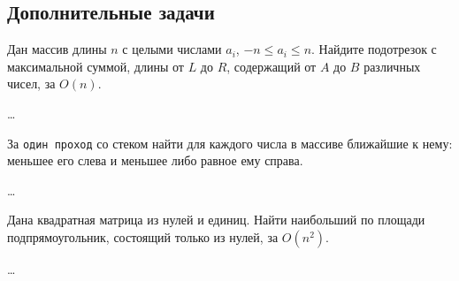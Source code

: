 \subsection*{Дополнительные задачи}

\begin{problem}
    Дан массив длины $n$ с целыми числами $a_i$, $-n \leq a_i \leq n$. Найдите подотрезок с максимальной суммой, длины от $L$ до $R$, содержащий от $A$ до $B$ различных чисел, за $O(n)$.
\end{problem}

\begin{solution}
    \dots
\end{solution}


\begin{problem}
    За \texttt{один проход} со стеком найти для каждого числа в массиве ближайшие к нему: меньшее его слева и меньшее либо равное ему справа.
\end{problem}

\begin{solution}
    \dots
\end{solution}


\begin{problem}
    Дана квадратная матрица из нулей и единиц. Найти наибольший по площади
    подпрямоугольник, состоящий только из нулей, за $O(n^2)$.
\end{problem}

\begin{solution}
    \dots
\end{solution}


\clearpage
